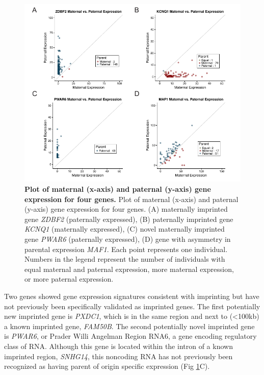 \begin{figure}[!htb]
\centering \includegraphics[width=7in]{img/ch03/fig-01.pdf}
\caption[Plot of maternal (x-axis) and paternal (y-axis) gene expression for four genes.]{\textbf{Plot of maternal (x-axis) and paternal (y-axis) gene expression for four genes.} Plot of maternal (x-axis) and paternal (y-axis) gene expression for four genes. (A) maternally imprinted gene \emph{ZDBF2} (paternally expressed), (B) paternally imprinted gene \emph{KCNQ1} (maternally expressed), (C) novel maternally imprinted gene \emph{PWAR6} (paternally expressed), (D) gene with asymmetry in parental expression \emph{MAF1}. Each point represents one individual. Numbers in the legend represent the number of individuals with equal maternal and paternal expression, more maternal expression, or more paternal expression.}
\label{fig:matpatexpression}
\end{figure}


Two genes showed gene expression signatures consistent with imprinting but have not previously been specifically validated as imprinted genes. The first potentially new imprinted gene is \emph{PXDC1}, which is in the same region and next to (\textless100kb) a known imprinted gene, \emph{FAM50B}. The second potentially novel imprinted gene is \emph{PWAR6}, or Prader Willi Angelman Region RNA6, a gene encoding regulatory class of RNA. Although this gene is located within the intron of a known imprinted region, \emph{SNHG14}, this noncoding RNA has not previously been recognized as having parent of origin specific expression (Fig \ref{fig:matpatexpression}C).

